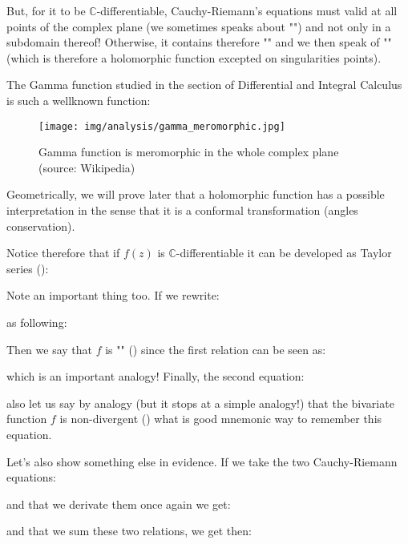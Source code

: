 	But, for it to be $\mathbb{C}$-differentiable, Cauchy-Riemann's equations must valid at all points of the complex plane (we sometimes speaks about "") and not only in a subdomain thereof! Otherwise, it contains therefore "" and we then speak of "" (which is therefore a holomorphic function excepted on singularities points).
	
	The Gamma function studied in the section of Differential and Integral Calculus is such a wellknown function:
	
	\begin{figure}[H]
		\centering
		\texttt{[image: img/analysis/gamma\_meromorphic.jpg]}
		\caption[Gamma function is meromorphic in the whole complex plane]{Gamma function is meromorphic in the whole complex plane (source: Wikipedia)}
	\end{figure}
	\begin{tcolorbox}[title=Remark,colframe=black,arc=10pt]
	Geometrically, we will prove later that a holomorphic function has a possible interpretation in the sense that it is a conformal transformation (angles conservation).
	\end{tcolorbox}
	
	Notice therefore that if $f (z)$ is $\mathbb{C}$-differentiable it can be developed as Taylor series ():
	
	Note an important thing too. If we rewrite:
	
	as following:
	
	Then we say that $f$ is "" () since the first relation can be seen as:
	
	which is an important analogy! Finally, the second equation:
	
	also let us say by analogy (but it stops at a simple analogy!) that the bivariate function $f$ is non-divergent () what is good mnemonic way to remember this equation.
	
	Let's also show something else in evidence. If we take the two Cauchy-Riemann equations:
	
	and that we derivate them once again we get:
	
	and that we sum these two relations, we get then:
	
